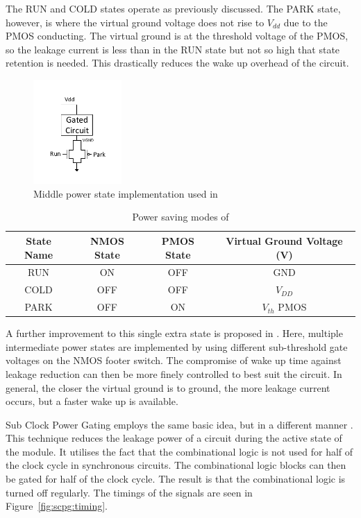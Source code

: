 The RUN and COLD states operate as previously discussed. 
The PARK state, however, is where the virtual ground voltage does not rise to $V_{dd}$ due to the PMOS conducting. 
The virtual ground is at the threshold voltage of the PMOS, so the leakage current is less than in the RUN state but not so high that state retention is needed. 
This drastically reduces the wake up overhead of the circuit. 
\begin{figure}
\centering
\includegraphics[width=0.3\textwidth]{Figures/powergating_kim.pdf}
\caption{Middle power state implementation used in \cite{kim2004experimental}}
\label{fig:kim}
\end{figure}

\begin{table}
\caption{Power saving modes of \cite{kim2004experimental}}
\label{tab:kim}
\centering
\begin{tabular}{|c|c|c|c|}\hline
State Name & NMOS State & PMOS State & Virtual Ground Voltage (V)\\ \hline
RUN  & ON   & OFF  & GND \\
COLD & OFF  & OFF  & $V_{DD}$ \\
PARK & OFF  & ON   & $V_{th}$ PMOS \\ \hline
\end{tabular}
\end{table}

A further improvement to this single extra state is proposed in \cite{singh2007enhanced}. 
Here, multiple intermediate power states are implemented by using different sub-threshold gate voltages on the NMOS footer switch. 
The compromise of wake up time against leakage reduction can then be more finely controlled to best suit the circuit.
In general, the closer the virtual ground is to ground, the more leakage current occurs, but a faster wake up is available. 

Sub Clock Power Gating employs the same basic idea, but in a different manner \cite{mistry2011sub}.
This technique reduces the leakage power of a circuit during the active state of the module.
It utilises the fact that the combinational logic is not used for half of the clock cycle in synchronous circuits.
The combinational logic blocks can then be gated for half of the clock cycle.
The result is that the combinational logic is turned off regularly. 
The timings of the signals are seen in Figure~\ref{fig:scpg:timing}.

